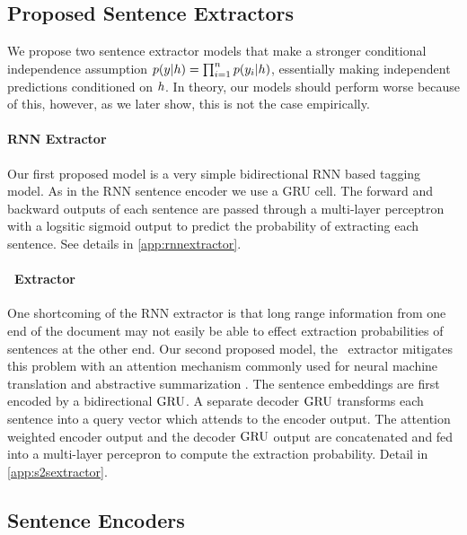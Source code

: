 \subsection{Proposed Sentence Extractors}
We propose two sentence extractor models that 
make a stronger conditional independence 
assumption $p(\slabel|\sentEmb)=\prod_{i=1}^\docSize p(\slabel[i]|\sentEmb)$,
essentially making independent predictions conditioned on $\sentEmb$.
In theory, our models should perform worse because of this, however, as
we later show, this is not the case empirically.

\paragraph{RNN Extractor}
    Our first proposed model is a very simple bidirectional
RNN based tagging model. As in the RNN sentence encoder we use a GRU cell.
The forward and backward outputs of each sentence are passed through a 
multi-layer perceptron with a logsitic sigmoid output 
to predict the probability
of extracting each sentence. See details in \autoref{app:rnnextractor}.

\paragraph{\sts~Extractor} One shortcoming of the RNN extractor is that long range
information from one end of the document may not easily be able to effect 
extraction probabilities of sentences at the other end. 
Our second proposed model, the \sts~extractor mitigates this problem with an 
attention 
mechanism commonly
used for neural machine translation \cite{bahdanau2014neural} and 
abstractive summarization \cite{see2017get}. 
The sentence embeddings are first
encoded by a bidirectional $\operatorname{GRU}$. A separate decoder $\operatorname{GRU}$ transforms each 
sentence into a query vector which attends to the encoder output. The
attention weighted encoder output and the decoder $\operatorname{GRU}$ output are concatenated
and fed into a multi-layer percepron to compute the extraction probability.
Detail in \autoref{app:s2sextractor}.


\subsection{Sentence Encoders}



